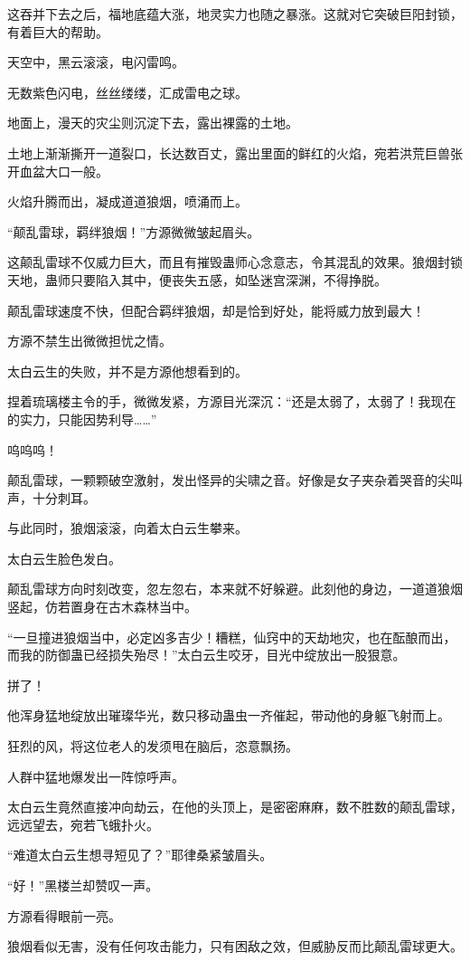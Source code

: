 \begin{this_body}
这吞并下去之后，福地底蕴大涨，地灵实力也随之暴涨。这就对它突破巨阳封锁，有着巨大的帮助。

天空中，黑云滚滚，电闪雷鸣。

无数紫色闪电，丝丝缕缕，汇成雷电之球。

地面上，漫天的灾尘则沉淀下去，露出裸露的土地。

土地上渐渐撕开一道裂口，长达数百丈，露出里面的鲜红的火焰，宛若洪荒巨兽张开血盆大口一般。

火焰升腾而出，凝成道道狼烟，喷涌而上。

“颠乱雷球，羁绊狼烟！”方源微微皱起眉头。

这颠乱雷球不仅威力巨大，而且有摧毁蛊师心念意志，令其混乱的效果。狼烟封锁天地，蛊师只要陷入其中，便丧失五感，如坠迷宫深渊，不得挣脱。

颠乱雷球速度不快，但配合羁绊狼烟，却是恰到好处，能将威力放到最大！

方源不禁生出微微担忧之情。

太白云生的失败，并不是方源他想看到的。

捏着琉璃楼主令的手，微微发紧，方源目光深沉：“还是太弱了，太弱了！我现在的实力，只能因势利导……”

呜呜呜！

颠乱雷球，一颗颗破空激射，发出怪异的尖啸之音。好像是女子夹杂着哭音的尖叫声，十分刺耳。

与此同时，狼烟滚滚，向着太白云生攀来。

太白云生脸色发白。

颠乱雷球方向时刻改变，忽左忽右，本来就不好躲避。此刻他的身边，一道道狼烟竖起，仿若置身在古木森林当中。

“一旦撞进狼烟当中，必定凶多吉少！糟糕，仙窍中的天劫地灾，也在酝酿而出，而我的防御蛊已经损失殆尽！”太白云生咬牙，目光中绽放出一股狠意。

拼了！

他浑身猛地绽放出璀璨华光，数只移动蛊虫一齐催起，带动他的身躯飞射而上。

狂烈的风，将这位老人的发须甩在脑后，恣意飘扬。

人群中猛地爆发出一阵惊呼声。

太白云生竟然直接冲向劫云，在他的头顶上，是密密麻麻，数不胜数的颠乱雷球，远远望去，宛若飞蛾扑火。

“难道太白云生想寻短见了？”耶律桑紧皱眉头。

“好！”黑楼兰却赞叹一声。

方源看得眼前一亮。

狼烟看似无害，没有任何攻击能力，只有困敌之效，但威胁反而比颠乱雷球更大。


\end{this_body}
